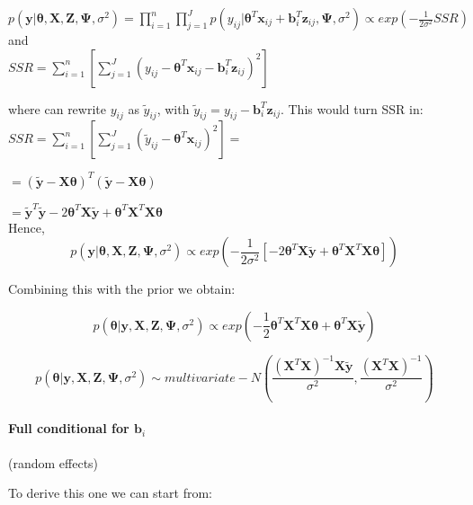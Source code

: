 \documentclass[a4paper]{article}
\begin{document}
$p(\bm{y}|\bm{\theta}, \bm{X}, \bm{Z}, \bm{\Psi}, \sigma^2) = \prod_{i=1}^n \prod_{j=1}^Jp(y_{ij}|\bm{\theta}^{T}\bm{x}_{ij} + \bm{b}_{i}^{T}\bm{z}_{ij}, \bm{\Psi}, \sigma^2) \propto exp(-\frac{1}{2\sigma^2}SSR)$ \\

and\\

$SSR = \sum_{i = 1}^{n}[\sum_{j = 1}^{J}( y_{ij}-\bm{\theta}^{T}\bm{x}_{ij} - \bm{b}_{i}^{T}\bm{z}_{ij})^2]$

where can rewrite $y_{ij}$ as $\tilde{y}_{ij}$, with $\tilde{y}_{ij} = y_{ij} - \bm{b}^{T}_{i}\bm{z}_{ij}$. This would turn SSR in:\\

$SSR = \sum_{i = 1}^{n}[\sum_{j = 1}^{J}( \tilde{y}_{ij}-\bm{\theta}^{T}\bm{x}_{ij})^2 ] =$

$= ( \tilde{\bm{y}} - \bm{X}\bm{\theta} )^{T}( \tilde{\bm{y}} - \bm{X}\bm{\theta} )$

$ = \tilde{\bm{y}}^{T}\tilde{\bm{y}} - 2\bm{\theta}^{T}\bm{X}\tilde{\bm{y}} + \bm{\theta}^{T}\bm{X}^{T}\bm{X}\bm{\theta}$\\

Hence,
\begin{equation}
p(\bm{y}|\bm{\theta}, \bm{X}, \bm{Z}, \bm{\Psi}, \sigma^2) \propto exp(-\frac{1}{2\sigma^2}[- 2\bm{\theta}^{T}\bm{X}\tilde{\bm{y}} + \bm{\theta}^{T}\bm{X}^{T}\bm{X}\bm{\theta}])
\end{equation}


Combining this with the prior we obtain:

\begin{equation}
	p(\bm{\theta}|\bm{y}, \bm{X}, \bm{Z}, \bm{\Psi}, \sigma^2) \propto exp(-\frac{1}{2}\bm{\theta}^{T}\bm{X}^{T}\bm{X}\bm{\theta} + \bm{\theta}^{T}\bm{X}\tilde{\bm{y}})
\end{equation}

\begin{equation}
	p(\bm{\theta}|\bm{y}, \bm{X}, \bm{Z}, \bm{\Psi}, \sigma^2) \sim multivariate-N(\frac{(\bm{X}^{T}\bm{X})^{-1}\bm{X}\bm{\tilde{y}}}{\sigma^2}, \frac{(\bm{X}^{T}\bm{X})^{-1}}{\sigma^2})
\end{equation}

\paragraph{Full conditional for $\bm{b}_{i}$} (random effects)

To derive this one we can start from:
\end{document}
